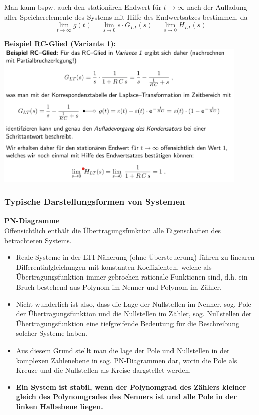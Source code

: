 \documentclass[12pt,a4paper]{scrartcl}
\begin{document}
  \noindent Man kann bspw. auch den stationären Endwert für $t \to \infty$ nach der Aufladung aller Speicherelemente des Systems mit Hilfe des Endwertsatzes bestimmen, da
  $$ \lim_{t\to\infty}g(t) = \lim_{s\to 0} s \cdot G_{LT}(s) = \lim_{s \to 0} H_{LT}(s)$$

  \noindent \textbf{Beispiel RC-Glied (Variante 1):}\\
  \includegraphics[height=7cm]{Pictures/Bsp1.png} 

  \subsubsection{Typische Darstellungsformen von Systemen}
  \label{sec:sub:sub:darstellungsformen-systeme}

  \noindent \textbf{PN-Diagramme}\\
  \noindent Offensichtlich enthält die Übertragungsfunktion alle Eigenschaften des betrachteten Systems.
  \begin{itemize}
  \item Reale Systeme in der LTI-Näherung (ohne Übersteuerung) führen zu linearen Differentialgleichungen mit konstanten Koeffizienten, welche als Übertragungsfunktion immer gebrochen-rationale Funktionen sind, d.h. ein Bruch bestehend aus Polynom im Nenner und Polynom im Zähler.
  \item Nicht wunderlich ist also, dass die Lage der Nullstellen im Nenner, sog. Pole der Übertragungsfunktion und die Nullstellen im Zähler, sog. Nullstellen der Übertragungsfunktion eine tiefgreifende Bedeutung für die Beschreibung solcher Systeme haben.
  \item Aus diesem Grund stellt man die lage der Pole und Nullstellen in der komplexen Zahlenebene in sog. PN-Diagrammen dar, worin die Pole als Kreuze und die Nullstellen als Kreise dargstellet werden.
  \item \textbf{Ein System ist stabil, wenn der Polynomgrad des Zählers kleiner gleich des Polynomgrades des Nenners ist und alle Pole in der linken Halbebene liegen. }
  \end{itemize}
\end{document}
